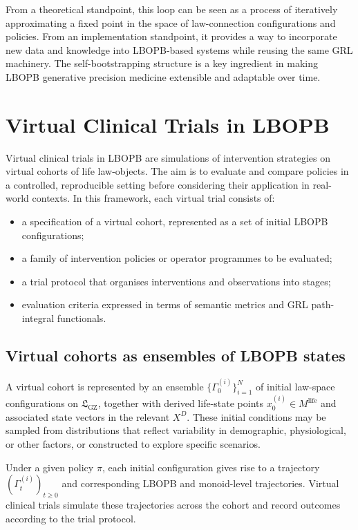 \documentclass[11pt]{book}
\theoremstyle{plain}
\theoremstyle{definition}
\theoremstyle{remark}
\newcommand{\GZLS}{\ensuremath{\mathfrak{L}_{\mathrm{GZ}}}}       \newcommand{\GZLT}{\ensuremath{M_{!w}}}                           \newcommand{\GZLOC}{\ensuremath{A_M}}                             \newcommand{\GZLCurv}{\ensuremath{\mathcal{F}_{\mathrm{law}}}}
\begin{document}
From a theoretical standpoint, this loop can be seen as a process of
iteratively approximating a fixed point in the space of law-connection
configurations and policies. From an implementation standpoint, it
provides a way to incorporate new data and knowledge into LBOPB-based
systems while reusing the same GRL machinery. The self-bootstrapping
structure is a key ingredient in making LBOPB generative precision
medicine extensible and adaptable over time.

\section{Virtual Clinical Trials in LBOPB}


Virtual clinical trials in LBOPB are simulations of intervention
strategies on virtual cohorts of life law-objects. The aim is to
evaluate and compare policies in a controlled, reproducible setting
before considering their application in real-world contexts. In this
framework, each virtual trial consists of:

\begin{itemize}
  \item a specification of a virtual cohort, represented as a set of
        initial LBOPB configurations;
  \item a family of intervention policies or operator programmes to
        be evaluated;
  \item a trial protocol that organises interventions and observations
        into stages;
  \item evaluation criteria expressed in terms of semantic metrics and
        GRL path-integral functionals.
\end{itemize}

\subsection*{Virtual cohorts as ensembles of LBOPB states}

A virtual cohort is represented by an ensemble
$\{ \Gamma^{(i)}_{0} \}_{i=1}^{N}$ of initial law-space configurations
on $\GZLS$, together with derived life-state points
$x^{(i)}_{0} \in M^{\mathrm{life}}$ and associated state vectors in
the relevant $X^{D}$. These initial conditions may be sampled from
distributions that reflect variability in demographic, physiological,
or other factors, or constructed to explore specific scenarios.

Under a given policy $\pi$, each initial configuration gives rise to a
trajectory $(\Gamma^{(i)}_{t})_{t \ge 0}$ and corresponding LBOPB and
monoid-level trajectories. Virtual clinical trials simulate these
trajectories across the cohort and record outcomes according to the
trial protocol.
\end{document}

